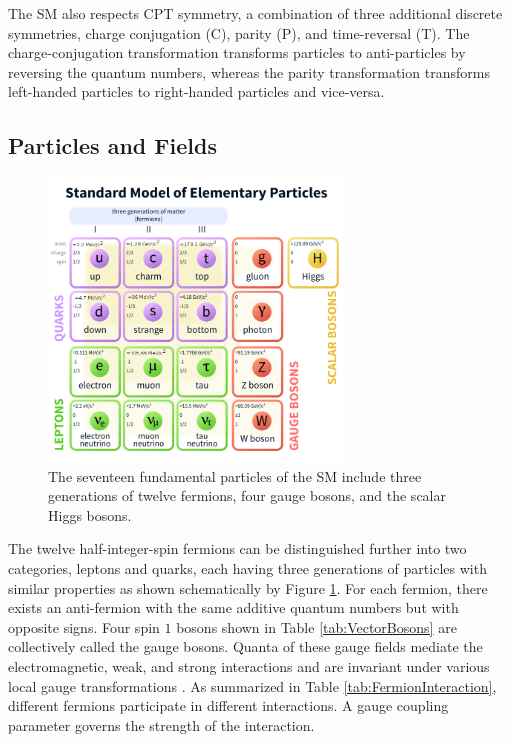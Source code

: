 The SM also respects CPT symmetry, a combination of three additional discrete symmetries, charge conjugation (C), parity (P), and time-reversal (T). The charge-conjugation transformation transforms particles to anti-particles by reversing the quantum numbers, whereas the parity transformation transforms left-handed particles to right-handed particles and vice-versa.

\subsection{Particles and Fields}
\label{subsec:Constituents}

\begin{figure}[H]
    \centering
    \includegraphics[width=0.7\textwidth] {figures/Theory/SMparticles.pdf}\hspace{1cm}
    \caption{ The seventeen fundamental particles of the SM include three generations of twelve fermions, four gauge bosons, and the scalar Higgs bosons. \cite{SMFigureWiki}}
    \label{fig:SM}
\end{figure}

The twelve half-integer-spin fermions can be distinguished further into two categories, leptons and quarks, each having three generations of particles with similar properties as shown schematically by Figure \ref{fig:SM}. For each fermion, there exists an anti-fermion with the same additive quantum numbers but with opposite signs. Four spin $1$ bosons shown in Table \ref{tab:VectorBosons} are collectively called the gauge bosons. Quanta of these gauge fields mediate the electromagnetic, weak, and strong interactions and are invariant under various local gauge transformations \cite{Bernabeu2021}. As summarized in Table \ref{tab:FermionInteraction}, different fermions participate in different interactions. A gauge coupling parameter governs the strength of the interaction.

